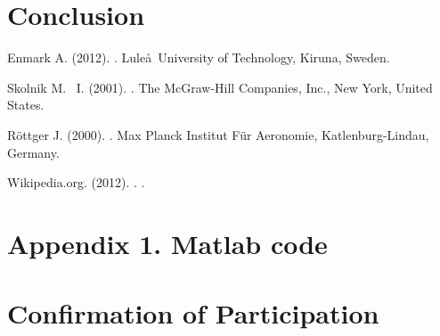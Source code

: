 \documentclass{article}
\begin{document}
\newpage
\section{Conclusion}


\begin{thebibliography}{9}

Enmark A.  (2012).
.
\newblock Lule\aa \ University of Technology, Kiruna, Sweden.

Skolnik M. ~I.  (2001).
.
\newblock The McGraw-Hill Companies, Inc., New York, United States.

R\"ottger J.  (2000).
.
\newblock Max Planck Institut F\"ur Aeronomie, Katlenburg-Lindau, Germany.

Wikipedia.org. (2012).
.
.

\end{thebibliography}


\newpage
\section{Appendix 1. Matlab code}


\newpage
\section{Confirmation of Participation}
\end{document}
